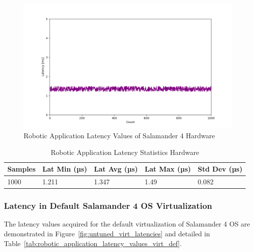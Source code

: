 \documentclass[MMR,Master,english]{style/twbook}
\begin{document}
\begin{figure}[H]
	\centering
	\includegraphics[width=1.0\columnwidth]{img/implementation/rtos_latencies.png}
	\caption[Robotic Application Latency Values of Salamander 4 Hardware]{Robotic Application Latency Values of Salamander 4 Hardware}
	\label{fig:rtos_latencies}
\end{figure}

\begin{table}[H]
	\centering
	\caption{Robotic Application Latency Statistics Hardware}
	\label{tab:robotic_application_latency_values_hardware}
	\setlength{\tabcolsep}{0.5em} %
	{\renewcommand{\arraystretch}{1.2}%
		\begin{tabular}{|l|l|l|l|l|}
			\hline
			\textbf{Samples} & \textbf{Lat Min (µs)} & \textbf{Lat Avg (µs)} & \textbf{Lat Max (µs)} & \textbf{Std Dev (µs)} \\ \hline

			1000             & 1.211                 & 1.347                 & 1.49                  & 0.082                 \\ \hline
		\end{tabular}}
\end{table}

\clearpage

\subsubsection{Latency in Default Salamander 4 OS Virtualization}\label{subsubsec:latency_virtualization}
\noindent The latency values acquired for the default virtualization of Salamander 4 OS are demonstrated in Figure~\ref{fig:untuned_virt_latencies} and detailed in Table~\ref{tab:robotic_application_latency_values_virt_def}.
\end{document}
